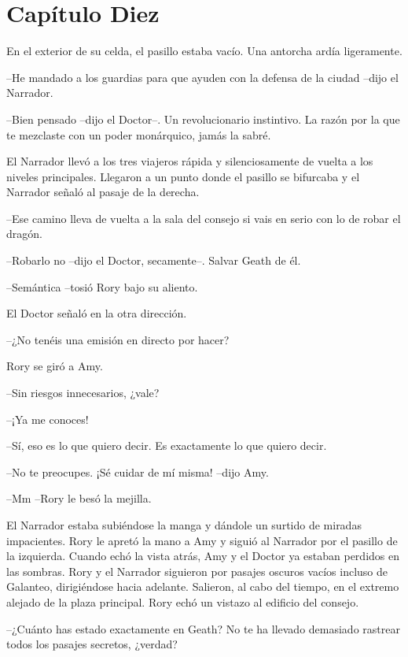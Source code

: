\chapter*{Capítulo Diez}

{En el exterior de su celda, el pasillo estaba vacío. Una antorcha ardía
ligeramente.}

{--He mandado a los guardias para que ayuden con la defensa de la
ciudad --dijo el Narrador.}

{--Bien pensado --dijo el Doctor--. Un revolucionario instintivo. La
razón por la que te mezclaste con un poder monárquico, jamás la sabré.}

{El Narrador llevó a los tres viajeros rápida y silenciosamente de
	vuelta a los niveles principales. Llegaron a un punto donde el pasillo
se bifurcaba y el Narrador señaló al pasaje de la derecha.}

{--Ese camino lleva de vuelta a la sala del consejo si vais en serio
con lo de robar el dragón.}

{--Robarlo no --dijo el Doctor, secamente--. Salvar Geath de él.}

{--Semántica --tosió Rory bajo su aliento.}

{El Doctor señaló en la otra dirección.}

{--¿No tenéis una emisión en directo por hacer?}

{Rory se giró a Amy.}

{--Sin riesgos innecesarios, ¿vale?}

{--¡Ya me conoces!}

{--Sí, eso es lo que quiero decir. Es exactamente lo que quiero
decir.}

{--No te preocupes. ¡Sé cuidar de mí misma! --dijo Amy.}

{--Mm --Rory le besó la mejilla.}

{El Narrador estaba subiéndose la manga y dándole un surtido de miradas
	impacientes. Rory le apretó la mano a Amy y siguió al Narrador por el
	pasillo de la izquierda. Cuando echó la vista atrás, Amy y el Doctor ya
	estaban perdidos en las sombras. Rory y el Narrador siguieron por
	pasajes oscuros vacíos incluso de Galanteo, dirigiéndose hacia adelante.
	Salieron, al cabo del tiempo, en el extremo alejado de la plaza
principal. Rory echó un vistazo al edificio del consejo.}

{--¿Cuánto has estado exactamente en Geath? No te ha llevado demasiado
rastrear todos los pasajes secretos, ¿verdad?}

